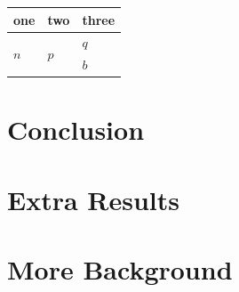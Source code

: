 \documentclass[a4paper]{article}
\begin{document}
    \begin{table}[H]
      \center
      \begin{tabular}{lll}
        \hline
        one & two & three \\
        \hline
        \hline
        \multirow{2}{*}{$n$} & \multirow{2}{*}{$p$} & $q$ \\
          & & $b$ \\
        \hline
      \end{tabular}
    \end{table}

  \section{Conclusion}


  \appendix
  \section{Extra Results}
  \section{More Background}
\end{document}
